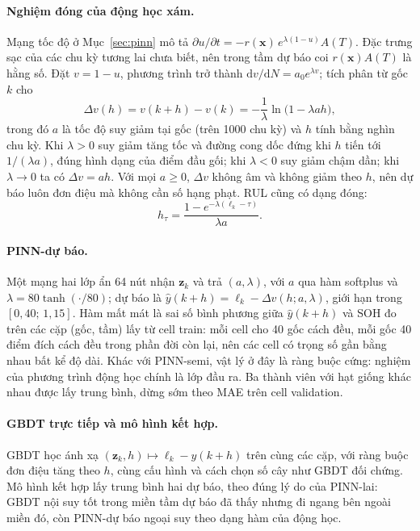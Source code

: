 \documentclass[12pt,a4paper,oneside]{report}
\theoremstyle{plain}
\theoremstyle{definition}
\begin{document}
\paragraph{Nghiệm đóng của động học xám.} Mạng tốc độ ở Mục~\ref{sec:pinn} mô tả
$\partial u/\partial t = -r(\mathbf{x})\,e^{\lambda(1-u)}A(T)$. Đặc trưng sạc của các chu kỳ tương lai chưa biết, nên
trong tầm dự báo coi $r(\mathbf{x})A(T)$ là hằng số. Đặt $v = 1 - u$, phương trình trở thành
$\mathrm{d}v/\mathrm{d}N = a_0 e^{\lambda v}$; tích phân từ gốc $k$ cho
\begin{equation}\label{eq:fcdrop}
  \Delta v(h) = v(k+h) - v(k) = -\frac{1}{\lambda}\ln\bigl(1 - \lambda a h\bigr),
\end{equation}
trong đó $a$ là tốc độ suy giảm tại gốc (trên 1000 chu kỳ) và $h$ tính bằng nghìn chu kỳ. Khi $\lambda > 0$ suy giảm
tăng tốc và đường cong dốc đứng khi $h$ tiến tới $1/(\lambda a)$, đúng hình dạng của điểm đầu gối; khi $\lambda < 0$ suy
giảm chậm dần; khi $\lambda \to 0$ ta có $\Delta v = a h$. Với mọi $a \ge 0$, $\Delta v$ không âm và không giảm theo
$h$, nên dự báo luôn đơn điệu mà không cần số hạng phạt. RUL cũng có dạng đóng:
\begin{equation}\label{eq:fcrul}
  h_\tau = \frac{1 - e^{-\lambda(\ell_k - \tau)}}{\lambda a}.
\end{equation}

\paragraph{PINN-dự báo.} Một mạng hai lớp ẩn 64 nút nhận $\mathbf{z}_k$ và trả $(a, \lambda)$, với $a$ qua hàm
softplus và $\lambda = 80\tanh(\cdot/80)$; dự báo là $\hat y(k+h) = \ell_k - \Delta v(h; a, \lambda)$, giới hạn trong
$[0{,}40;\,1{,}15]$. Hàm mất mát là sai số bình phương giữa $\hat y(k+h)$ và SOH đo trên các cặp (gốc, tầm) lấy từ
cell train: mỗi cell cho 40 gốc cách đều, mỗi gốc 40 điểm đích cách đều trong phần đời còn lại, nên các cell có trọng
số gần bằng nhau bất kể độ dài. Khác với PINN-semi, vật lý ở đây là ràng buộc cứng: nghiệm của phương trình động học
chính là lớp đầu ra. Ba thành viên với hạt giống khác nhau được lấy trung bình, dừng sớm theo MAE trên cell
validation.

\paragraph{GBDT trực tiếp và mô hình kết hợp.} GBDT học ánh xạ $(\mathbf{z}_k, h) \mapsto \ell_k - y(k+h)$ trên cùng
các cặp, với ràng buộc đơn điệu tăng theo $h$, cùng cấu hình và cách chọn số cây như GBDT đối chứng. Mô hình kết hợp
lấy trung bình hai dự báo, theo đúng lý do của PINN-lai: GBDT nội suy tốt trong miền tầm dự báo đã thấy nhưng đi
ngang bên ngoài miền đó, còn PINN-dự báo ngoại suy theo dạng hàm của động học.
\end{document}
